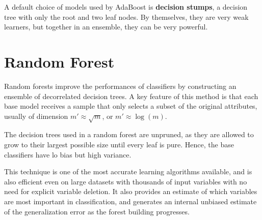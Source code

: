 A default choice of models used by AdaBoost is \textbf{decision stumps}, a decision tree with only the root and two leaf nodes. By themselves, they are very weak learners, but together in an ensemble, they can be very powerful.

\section{Random Forest}

Random forests improve the performances of classifiers by constructing an ensemble of decorrelated decision trees. A key feature of this method is that each base model receives a sample that only selects a subset of the original attributes, usually of dimension $m' \approx \sqrt{m}$, or $m' \approx \log(m)$.

The decision trees used in a random forest are unpruned, as they are allowed to grow to their largest possible size until every leaf is pure. Hence, the base classifiers have lo bias but high variance.

This technique is one of the most accurate learning algorithms available, and is also efficient even on large datasets with thousands of input variables with no need for explicit variable deletion. It also provides an estimate of which variables are most important in classification, and generates an internal unbiased estimate of the generalization error as the forest building progresses.